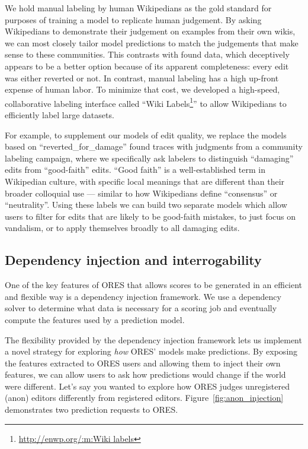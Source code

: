 %
We hold manual labeling by human Wikipedians as the gold standard for purposes of training a model to replicate human judgement.  By asking Wikipedians to demonstrate their judgement on examples from their own wikis, we can most closely tailor model predictions to match the judgements that make sense to these communities.  This contrasts with found data, which deceptively appears to be a better option because of its apparent completeness: every edit was either reverted or not.  In contrast, manual labeling has a high up-front expense of human labor.  To minimize that cost, we developed a high-speed, collaborative labeling interface called ``Wiki Labels\footnote{\url{http://enwp.org/:m:Wiki labels}}'' to allow Wikipedians to efficiently label large datasets.

For example, to supplement our models of edit quality, we replace the models based on ``reverted\_for\_damage'' found traces with judgments from a community labeling campaign, where we specifically ask labelers to distinguish ``damaging'' edits from ``good-faith'' edits. ``Good faith'' is a well-established term in Wikipedian culture, with specific local meanings that are different than their broader colloquial use --- similar to how Wikipedians define ``consensus'' or ``neutrality''.  Using these labels we can build two separate models which allow users to filter for edits that are likely to be good-faith mistakes\cite{halfaker2017automated}, to just focus on vandalism, or to apply themselves broadly to all damaging edits.

\subsection{Dependency injection and interrogability}
One of the key features of ORES that allows scores to be generated in an efficient and flexible way is a dependency injection framework.  We use a dependency solver to determine what data is necessary for a scoring job and eventually compute the features used by a prediction model.

The flexibility provided by the dependency injection framework lets us implement a novel strategy for exploring \emph{how} ORES' models make predictions.  By exposing the features extracted to ORES users and allowing them to inject their own features, we can allow users to ask how predictions would change if the world were different.  Let's say you wanted to explore how ORES judges unregistered (anon) editors differently from registered editors.  Figure~\ref{fig:anon_injection} demonstrates two prediction requests to ORES.


